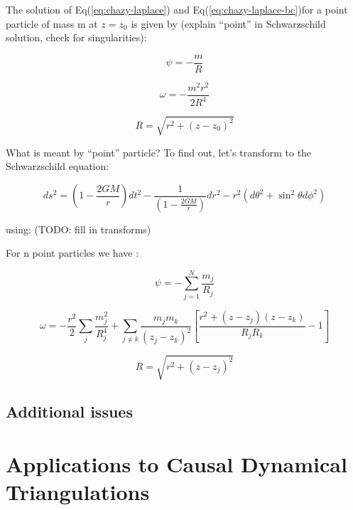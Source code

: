 \documentclass{article}
\begin{document}
The solution of Eq(\ref{eq:chazy-laplace}) and Eq(\ref{eq:chazy-laplace-bc})for
a point particle of mass m at $z=z_{0}$ is given by (explain ``point''
in Schwarzschild solution, check for singularities):

\begin{equation}
\psi=-\frac{m}{R}
\end{equation}


\begin{equation}
\omega=-\frac{m^{2}r^{2}}{2R^{4}}
\end{equation}


\begin{equation}
R=\sqrt{r^{2}+\left(z-z_{0}\right)^{2}}
\end{equation}

What is meant by ``point'' particle? To find out, let's transform
to the Schwarzschild equation:

\begin{equation}
ds^{2}=\left(1-\frac{2GM}{r}\right)dt^{2}-\frac{1}{\left(1-\frac{2GM}{r}\right)}dr^{2}-r^{2}\left(d\theta^{2}+\sin^{2}\theta d\phi^{2}\right)
\end{equation}


using: (TODO: fill in transforms)

For n point particles we have \cite{letelier1997superposition}:

\begin{equation}
\psi=-\sum_{j=1}^{N}\frac{m_{j}}{R_{j}}
\end{equation}


\begin{equation}
\omega=-\frac{r^{2}}{2}\sum_{j}\frac{m_{j}^{2}}{R_{j}^{4}}+\sum_{j\neq k}\frac{m_{j}m_{k}}{\left(z_{j}-z_{k}\right)^{2}}\left[\frac{r^{2}+\left(z-z_{j}\right)\left(z-z_{k}\right)}{R_{j}R_{k}}-1\right]
\end{equation}


\begin{equation}
R=\sqrt{r^{2}+\left(z-z_{j}\right)^{2}}
\end{equation}

\subsection{Additional issues}



\section{Applications to Causal Dynamical Triangulations}
\end{document}
